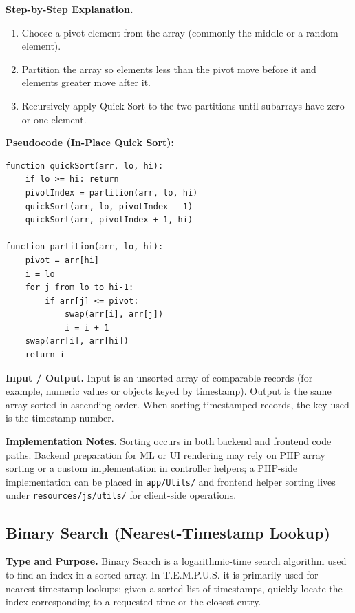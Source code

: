\documentclass[12pt]{article}
\begin{document}
\noindent\textbf{Step-by-Step Explanation.}
\begin{enumerate}
    \item Choose a pivot element from the array (commonly the middle or a random element).
    \item Partition the array so elements less than the pivot move before it and elements greater move after it.
    \item Recursively apply Quick Sort to the two partitions until subarrays have zero or one element.
\end{enumerate}

\noindent\textbf{Pseudocode (In-Place Quick Sort):}
\begin{lstlisting}[language=Pseudocode, caption={In-place Quick Sort algorithm}]
function quickSort(arr, lo, hi):
    if lo >= hi: return
    pivotIndex = partition(arr, lo, hi)
    quickSort(arr, lo, pivotIndex - 1)
    quickSort(arr, pivotIndex + 1, hi)

function partition(arr, lo, hi):
    pivot = arr[hi]
    i = lo
    for j from lo to hi-1:
        if arr[j] <= pivot:
            swap(arr[i], arr[j])
            i = i + 1
    swap(arr[i], arr[hi])
    return i
\end{lstlisting}

\noindent\textbf{Input / Output.} Input is an unsorted array of comparable records (for example, numeric values or objects keyed by timestamp). Output is the same array sorted in ascending order. When sorting timestamped records, the key used is the timestamp number.

\noindent\textbf{Implementation Notes.} Sorting occurs in both backend and frontend code paths. Backend preparation for ML or UI rendering may rely on PHP array sorting or a custom implementation in controller helpers; a PHP-side implementation can be placed in \texttt{app/Utils/} and frontend helper sorting lives under \texttt{resources/js/utils/} for client-side operations.

\subsection{Binary Search (Nearest-Timestamp Lookup)}

\noindent\textbf{Type and Purpose.} Binary Search is a logarithmic-time search algorithm used to find an index in a sorted array. In T.E.M.P.U.S. it is primarily used for nearest-timestamp lookups: given a sorted list of timestamps, quickly locate the index corresponding to a requested time or the closest entry.
\end{document}

